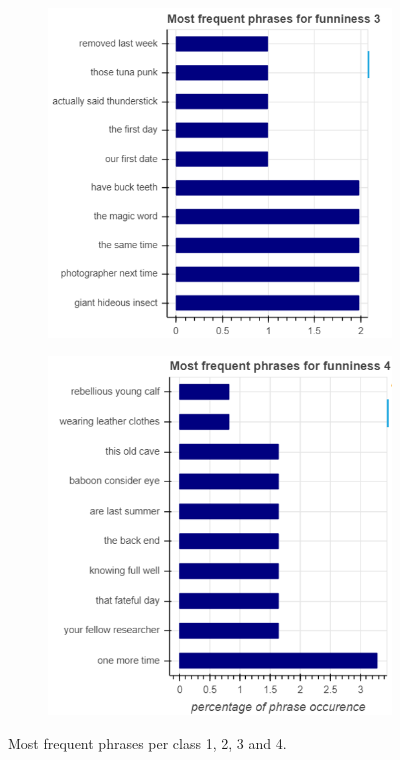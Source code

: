 \documentclass[draft,final,oneside]{vutinfth} %
\begin{document}
\begin{figure}
\begin{subfigure}[b]{0.45\textwidth}
\centering
\includegraphics[width=1.0\textwidth]{graphics/phrases/funniness_3}
\end{subfigure}\quad
\begin{subfigure}[b]{0.45\textwidth}
\centering
\includegraphics[width=1.0\textwidth]{graphics/phrases/funniness_4}
\end{subfigure}


\caption{Most frequent phrases per class 1, 2, 3 and 4.}
\label{fig:phraseocc1}

\end{figure}
\end{document}
